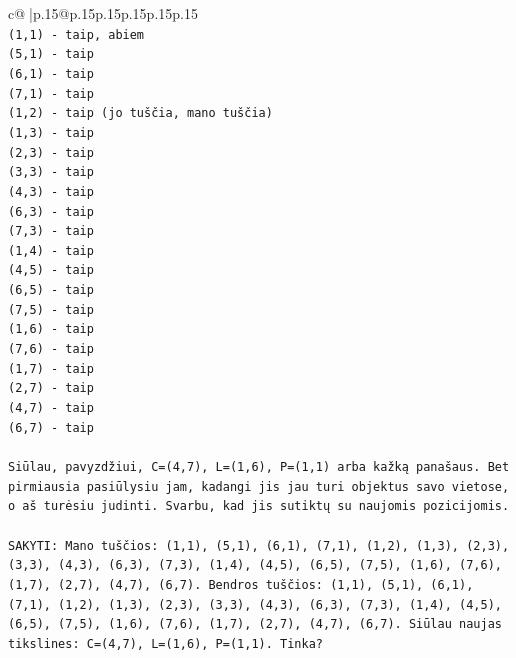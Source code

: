 \documentclass{article}
\begin{document}
{\begin{supertabular}{c@{$\;$}|p{.15\linewidth}@{}p{.15\linewidth}p{.15\linewidth}p{.15\linewidth}p{.15\linewidth}p{.15\linewidth}}
{{{\\ 
\texttt{(1,1) {-} taip, abiem} \\
\texttt{(5,1) {-} taip} \\
\texttt{(6,1) {-} taip} \\
\texttt{(7,1) {-} taip} \\
\texttt{(1,2) {-} taip (jo tuščia, mano tuščia)} \\
\texttt{(1,3) {-} taip} \\
\texttt{(2,3) {-} taip} \\
\texttt{(3,3) {-} taip} \\
\texttt{(4,3) {-} taip} \\
\texttt{(6,3) {-} taip} \\
\texttt{(7,3) {-} taip} \\
\texttt{(1,4) {-} taip} \\
\texttt{(4,5) {-} taip} \\
\texttt{(6,5) {-} taip} \\
\texttt{(7,5) {-} taip} \\
\texttt{(1,6) {-} taip} \\
\texttt{(7,6) {-} taip} \\
\texttt{(1,7) {-} taip} \\
\texttt{(2,7) {-} taip} \\
\texttt{(4,7) {-} taip} \\
\texttt{(6,7) {-} taip} \\
\\ 
\texttt{Siūlau, pavyzdžiui, C=(4,7), L=(1,6), P=(1,1) arba kažką panašaus. Bet pirmiausia pasiūlysiu jam, kadangi jis jau turi objektus savo vietose, o aš turėsiu judinti. Svarbu, kad jis sutiktų su naujomis pozicijomis.} \\
\\ 
\texttt{SAKYTI: Mano tuščios: (1,1), (5,1), (6,1), (7,1), (1,2), (1,3), (2,3), (3,3), (4,3), (6,3), (7,3), (1,4), (4,5), (6,5), (7,5), (1,6), (7,6), (1,7), (2,7), (4,7), (6,7). Bendros tuščios: (1,1), (5,1), (6,1), (7,1), (1,2), (1,3), (2,3), (3,3), (4,3), (6,3), (7,3), (1,4), (4,5), (6,5), (7,5), (1,6), (7,6), (1,7), (2,7), (4,7), (6,7). Siūlau naujas tikslines: C=(4,7), L=(1,6), P=(1,1). Tinka?} \\
            }
        }
    }
     \\ \\


\end{supertabular}}
\end{document}
